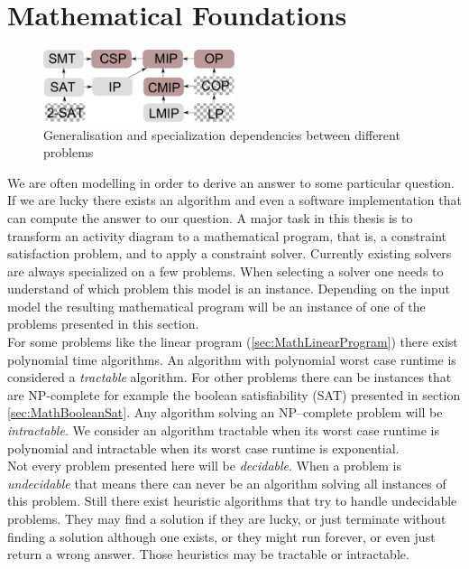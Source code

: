 \section{Mathematical Foundations}
\label{sec:Maths}
\begin{figure}
\begin{center}
\includegraphics[width=0.5\textwidth]{./pics/ProblemLatice.pdf}
\end{center}
\caption{Generalisation and specialization dependencies between different problems}
\label{fig:problemLatice}
\end{figure}
We are often modelling in order to derive an answer to some particular question. If we are lucky there exists an algorithm and even a software implementation that can compute the answer to our question. A major task in this thesis is to transform an activity diagram to a mathematical program, that is, a constraint satisfaction problem, and to apply a constraint solver. Currently existing solvers are always specialized on a few problems. When selecting a solver one needs to understand of which problem this model is an instance. Depending on the input model the resulting mathematical program will be an instance of one of the problems presented in this section.\\
For some problems like the linear program (\ref{sec:MathLinearProgram}) there exist polynomial time algorithms. An algorithm with polynomial worst case runtime is considered a \emph{tractable} algorithm. For other problems there can be instances that are NP-complete for example the boolean satisfiability (SAT) presented in section \ref{sec:MathBooleanSat}. Any algorithm solving an NP--complete problem will be \emph{intractable}. We consider an algorithm tractable when its worst case runtime is polynomial and intractable when its worst case runtime is exponential.\\
Not every problem presented here will be \emph{decidable}. When a problem is \emph{undecidable} that means there can never be an algorithm solving all instances of this problem. Still there exist heuristic algorithms that try to handle undecidable problems. They may find a solution if they are lucky, or just terminate without finding a solution although one exists, or they might run forever, or even just return a wrong answer. Those heuristics may be tractable or intractable.\\
